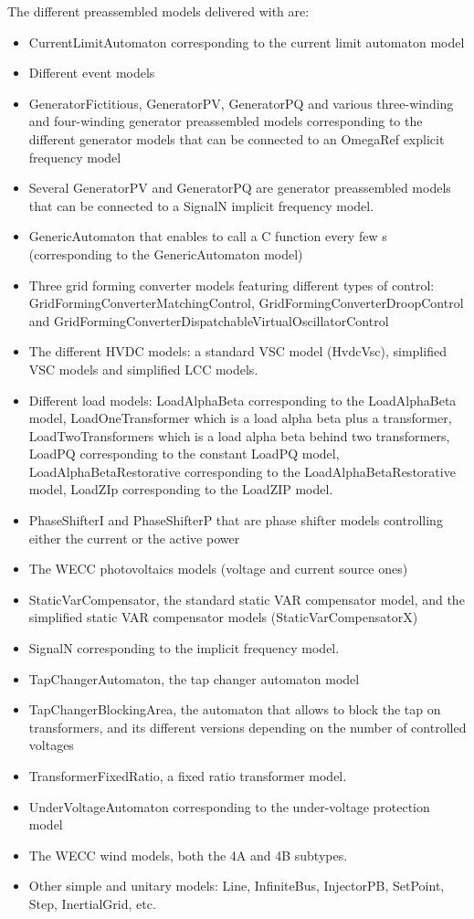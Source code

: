 \documentclass[a4paper, 12pt]{report}
\begin{document}
The different preassembled models delivered with \Dynawo are:
\begin{itemize}
\item CurrentLimitAutomaton corresponding to the current limit automaton model
\item Different event models
\item GeneratorFictitious, GeneratorPV, GeneratorPQ and various three-winding and four-winding generator preassembled models corresponding to the different generator models that can be connected to an OmegaRef explicit frequency model
\item Several GeneratorPV and GeneratorPQ are generator preassembled models that can be connected to a SignalN implicit frequency model.
\item GenericAutomaton that enables to call a C function every few s (corresponding to the GenericAutomaton model)
\item Three grid forming converter models featuring different types of control: GridFormingConverterMatchingControl, GridFormingConverterDroopControl and GridFormingConverterDispatchableVirtualOscillatorControl
\item The different HVDC models: a standard VSC model (HvdcVsc), simplified VSC models and simplified LCC models.
\item Different load models: LoadAlphaBeta corresponding to the LoadAlphaBeta model, LoadOneTransformer which is a load alpha beta plus a transformer, LoadTwoTransformers which is a load alpha beta behind two transformers, LoadPQ corresponding to the constant LoadPQ model, LoadAlphaBetaRestorative corresponding to the LoadAlphaBetaRestorative model, LoadZIp corresponding to the LoadZIP model.
\item PhaseShifterI and PhaseShifterP that are phase shifter models controlling either the current or the active power
\item The \ac{WECC} photovoltaics models (voltage and current source ones)
\item StaticVarCompensator, the standard static VAR compensator model, and the simplified static VAR compensator models (StaticVarCompensatorX)
\item SignalN corresponding to the implicit frequency model.
\item TapChangerAutomaton, the tap changer automaton model
\item TapChangerBlockingArea, the automaton that allows to block the tap on transformers, and its different versions depending on the number of controlled voltages
\item TransformerFixedRatio, a fixed ratio transformer model.
\item UnderVoltageAutomaton corresponding to the under-voltage protection model
\item The \ac{WECC} wind models, both the 4A and 4B subtypes.
\item Other simple and unitary models: Line, InfiniteBus, InjectorPB, SetPoint, Step, InertialGrid, etc.
\end{itemize}
\end{document}
